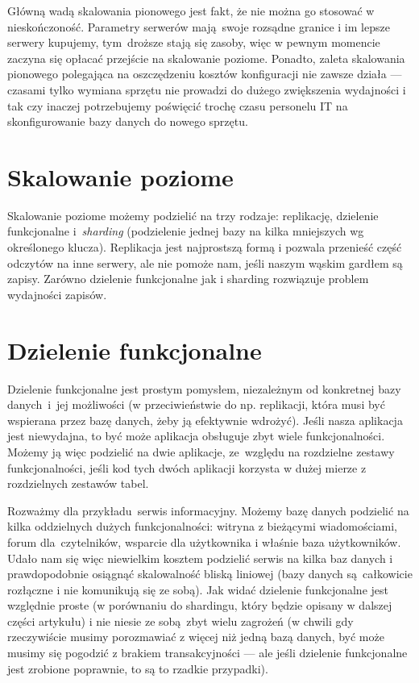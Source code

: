 \documentclass[a4paper,12pt]{article}
\begin{document}
Główną wadą skalowania pionowego jest fakt, że nie można go stosować w nieskończoność. Parametry serwerów mają swoje rozsądne granice i im lepsze serwery kupujemy, tym~droższe stają się zasoby, więc w pewnym momencie zaczyna się opłacać przejście na skalowanie poziome. Ponadto, zaleta skalowania pionowego polegająca na oszczędzeniu kosztów konfiguracji nie zawsze działa --- czasami tylko wymiana sprzętu nie prowadzi do dużego zwiększenia wydajności i tak czy inaczej potrzebujemy poświęcić trochę czasu personelu IT na skonfigurowanie bazy danych do nowego sprzętu.

\section{Skalowanie poziome}

Skalowanie poziome możemy podzielić na trzy rodzaje: replikację, dzielenie funkcjonalne i~\textit{sharding} (podzielenie jednej bazy na kilka mniejszych wg określonego klucza). Replikacja jest najprostszą formą i pozwala przenieść część odczytów na inne serwery, ale nie pomoże nam, jeśli naszym wąskim gardłem są zapisy. Zarówno dzielenie funkcjonalne jak i sharding rozwiązuje problem wydajności zapisów.

\section{Dzielenie funkcjonalne}

Dzielenie funkcjonalne jest prostym pomysłem, niezależnym od konkretnej bazy danych~i~jej możliwości (w przeciwieństwie do np. replikacji, która musi być wspierana przez bazę danych, żeby ją efektywnie wdrożyć). Jeśli nasza aplikacja jest niewydajna, to być może aplikacja obsługuje zbyt wiele funkcjonalności. Możemy ją więc podzielić na dwie aplikacje, ze~względu na rozdzielne zestawy funkcjonalności, jeśli kod tych dwóch aplikacji korzysta w dużej mierze z rozdzielnych zestawów tabel.

Rozważmy dla przykładu serwis informacyjny. Możemy bazę danych podzielić na kilka oddzielnych dużych funkcjonalności: witryna z bieżącymi wiadomościami, forum dla~czytelników, wsparcie dla użytkownika i właśnie baza użytkowników. Udało nam się więc niewielkim kosztem podzielić serwis na kilka baz danych i prawdopodobnie osiągnąć skalowalność bliską liniowej (bazy danych są całkowicie rozłączne i nie komunikują się ze sobą). Jak widać dzielenie funkcjonalne jest względnie proste (w porównaniu do shardingu, który będzie opisany w dalszej części artykułu) i nie niesie ze sobą zbyt wielu zagrożeń (w chwili gdy rzeczywiście musimy porozmawiać z więcej niż jedną bazą danych, być może musimy się pogodzić z brakiem transakcyjności --- ale jeśli dzielenie funkcjonalne jest zrobione poprawnie, to są to rzadkie przypadki).
\end{document}
